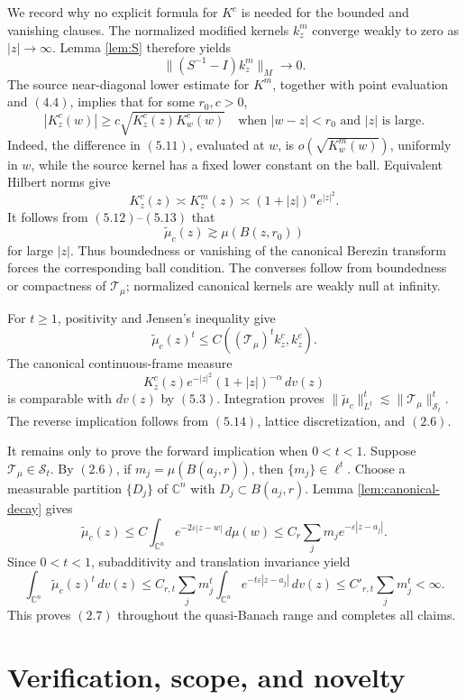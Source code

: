 \documentclass[11pt]{article}
\newcommand{\Cn}{\mathbb C^n}
\newcommand{\Sc}{\mathcal S}
\newcommand{\Tc}{\mathcal T}
\begin{document}
We record why no explicit formula for \(K^c\) is needed for the bounded and
vanishing clauses.  The normalized modified kernels \(k^m_z\) converge weakly
to zero as \(|z|\to\infty\).  Lemma \ref{lem:S} therefore yields
\[
 \|(S^{-1}-I)k^m_z\|_{M}\longrightarrow0.                         \tag{5.11}
\]
The source near-diagonal lower estimate for \(K^m\), together with point
evaluation and \((4.4)\), implies that for some \(r_0,c>0\),
\[
 |K^c_z(w)|\geq c\sqrt{K^c_z(z)K^c_w(w)}
 \quad\text{when }|w-z|<r_0\text{ and }|z|\text{ is large}.        \tag{5.12}
\]
Indeed, the difference in \((5.11)\), evaluated at \(w\), is
\(o(\sqrt{K^m_w(w)})\), uniformly in \(w\), while the source kernel has a
fixed lower constant on the ball.  Equivalent Hilbert norms give
\[
 K^c_z(z)\asymp K^m_z(z)\asymp(1+|z|)^\alpha e^{|z|^2}.            \tag{5.13}
\]
It follows from \((5.12)\)--\((5.13)\) that
\[
 \widetilde\mu_c(z)\gtrsim\mu(B(z,r_0))                           \tag{5.14}
\]
for large \(|z|\).  Thus boundedness or vanishing of the canonical Berezin
transform forces the corresponding ball condition.  The converses follow
from boundedness or compactness of \(\Tc_\mu\); normalized canonical kernels
are weakly null at infinity.

For \(t\geq1\), positivity and Jensen's inequality give
\[
 \widetilde\mu_c(z)^t\leq C((\Tc_\mu)^t k^c_z,k^c_z).
\]
The canonical continuous-frame measure
\[
 K^c_z(z)e^{-|z|^2}(1+|z|)^{-\alpha}\,dv(z)
\]
is comparable with \(dv(z)\) by \((5.3)\).  Integration proves
\(\|\widetilde\mu_c\|_{L^t}^t\lesssim\|\Tc_\mu\|_{\Sc_t}^t\).
The reverse implication follows from \((5.14)\), lattice discretization, and
\((2.6)\).

It remains only to prove the forward implication when \(0<t<1\).  Suppose
\(\Tc_\mu\in\Sc_t\).  By \((2.6)\), if
\(m_j=\mu(B(a_j,r))\), then \(\{m_j\}\in\ell^t\).  Choose a measurable
partition \(\{D_j\}\) of \(\Cn\) with \(D_j\subset B(a_j,r)\).  Lemma
\ref{lem:canonical-decay} gives
\[
 \widetilde\mu_c(z)
 \leq C\int_{\Cn}e^{-2\varepsilon|z-w|}\,d\mu(w)
 \leq C_r\sum_j m_j e^{-\varepsilon|z-a_j|}.                    \tag{5.15}
\]
Since \(0<t<1\), subadditivity and translation invariance yield
\[
 \int_{\Cn}\widetilde\mu_c(z)^t\,dv(z)
 \leq C_{r,t}\sum_j m_j^t
 \int_{\Cn}e^{-t\varepsilon|z-a_j|}\,dv(z)
 \leq C'_{r,t}\sum_jm_j^t<\infty.                               \tag{5.16}
\]
This proves \((2.7)\) throughout the quasi-Banach range and completes all
claims.

\section{Verification, scope, and novelty}
\end{document}
